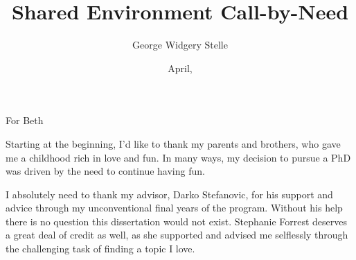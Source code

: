 \documentclass[botnum, fleqn]{unmeethesis}
\begin{document}
\frontmatter



\title{Shared Environment Call-by-Need}

\author{George Widgery Stelle}





\date{April, \thisyear}

\maketitle


\begin{dedication}
For Beth 
\end{dedication}

\begin{acknowledgments}
  \vspace{1.1in}
  Starting at the beginning, I'd like to thank my parents and brothers, who gave
  me a childhood rich in love and fun. In many ways, my decision to pursue a PhD
  was driven by the need to continue having fun.  

  I absolutely need to thank my advisor, Darko Stefanovic, for his support
  and advice through my unconventional final years of the program. Without his
  help there is no question this dissertation would not exist. Stephanie Forrest
  deserves a great deal of credit as well, as she supported and advised me
  selflessly through the challenging task of finding a topic I love. 

\end{acknowledgments}

\maketitleabstract %
\end{document}
